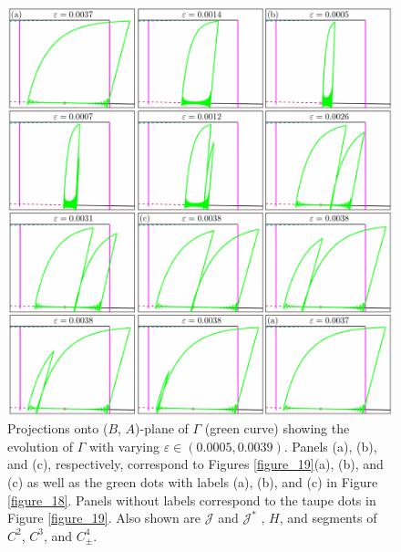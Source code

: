 \documentclass{ws-ijbc}
\begin{document}
\begin{figure}[H]
\centering
\includegraphics[]{./figures/MKMO_20.pdf}
\caption{Projections onto ($B$, $A$)-plane of $\Gamma$ (green curve) showing the evolution of $\Gamma$ with varying $\varepsilon \in (0.0005, 0.0039)$.  Panels (a), (b), and (c), respectively, correspond to Figures \ref{figure_19}(a), (b), and (c) as well as the green dots with labels (a), (b), and (c) in Figure \ref{figure_18}.  Panels without labels correspond to the taupe dots in Figure \ref{figure_19}.  Also shown are $\mathscr{J}$ and $\mathscr{J}^*$ , $H$, and segments of $C^2$, $C^3$, and $C^4_\pm$.}
\label{figure_20}
\end{figure}
\end{document}
